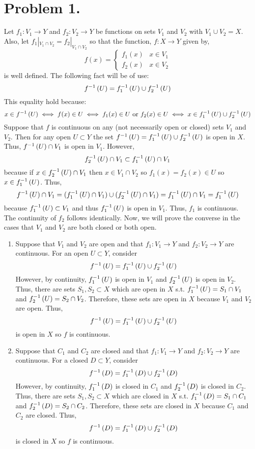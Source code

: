 \documentclass[12pt]{extarticle}
\begin{document}

\section*{Problem 1.}
Let $f_1 : V_1 \to Y$ and $f_2 : V_2 \to Y$ be functions on sets $V_1$ and $V_2$ with $V_1 \cup V_2 = X$. Also, let $f_1 |_{V_1 \cap V_2} = f_2 |_{V_1 \cap V_2}$ so that the function, $f : X \to Y$ given by, 
\[ f(x) =  
\begin{cases}
f_1(x) & x \in V_1 \\
f_2(x) & x \in V_2
\end{cases}
\]
is well defined. The following fact will be of use: 
\[f^{-1} \left( U \right) = f_1^{-1} \left( U \right) \cup f_2^{-1} \left( U \right)\]
This equality hold because:
\[x \in f^{-1} \left( U \right) \iff f(x) \in U \iff f_1(x) \in U \text{ or } f_2(x) \in U \iff x \in f_1^{-1} \left( U \right) \cup f_2^{-1} \left( U \right)\] 
Suppose that $f$ is continuous on any (not necessarily open or closed) sets $V_1$ and $V_2$. Then for any open $U \subset Y$ the set $f^{-1} \left( U \right) = f_1^{-1} \left( U \right) \cup f_2^{-1} \left( U \right)$ is open in $X$. Thus, $f^{-1} \left( U \right) \cap V_1$ is open in $V_1$. However, \[f_2^{-1} \left( U \right) \cap V_1 \subset f_1^{-1} \left( U \right) \cap V_1\] because if $x \in f_2^{-1} \left( U \right) \cap V_1$ then $x \in V_1 \cap V_2$ so $f_1(x) = f_2(x) \in U$ so $x \in f_1^{-1} \left( U \right)$. Thus, \[f^{-1} \left( U \right) \cap V_1 = (f_1^{-1} \left( U \right) \cap V_1) \cup (f_2^{-1} \left( U \right) \cap V_1) = f_1^{-1} \left( U \right) \cap V_1 = f_1^{-1} \left( U \right)\] because $f_1^{-1} \left( U \right) \subset V_1$ and thus $f_1^{-1} \left( U \right)$ is open in $V_1$. Thus, $f_1$ is continuous. The continuity of $f_2$ follows identically. Now, we will prove the converse in the cases that $V_1$ and $V_2$ are both closed or both open. 

\begin{enumerate}
\item Suppose that $V_1$ and $V_2$ are open and that $f_1 : V_1 \to Y$ and $f_2 : V_2 \to Y$ are continuous. For an open $U \subset Y$, consider \[f^{-1} \left( U \right) = f_1^{-1} \left( U \right) \cup f_2^{-1} \left( U \right)\]
However, by continuity, $f_1^{-1} \left( U \right)$ is open in $V_1$ and $f_2^{-1} \left( U \right)$ is open in $V_2$. Thus, there are sets $S_1, S_2 \subset X$ which are open in $X$ s.t. $f_1^{-1} \left( U \right) = S_1 \cap V_1$ and $f_2^{-1} \left( U \right) = S_2 \cap V_2$. Therefore, these sets are open in $X$ because $V_1$ and $V_2$ are open. Thus, \[f^{-1} \left( U \right) = f_1^{-1} \left( U \right) \cup f_2^{-1} \left( U \right)\] is open in $X$ so $f$ is continuous.

\item Suppose that $C_1$ and $C_2$ are closed and that $f_1 : V_1 \to Y$ and $f_2 : V_2 \to Y$ are continuous. For a closed $D \subset Y$, consider \[f^{-1} \left( D \right) = f_1^{-1} \left( D \right) \cup f_2^{-1} \left( D \right)\]
However, by continuity, $f_1^{-1} \left( D \right)$ is closed in $C_1$ and $f_2^{-1} \left( D \right)$ is closed in $C_2$. Thus, there are sets $S_1, S_2 \subset X$ which are closed in $X$ s.t. $f_1^{-1} \left( D \right) = S_1 \cap C_1$ and $f_2^{-1} \left( D \right) = S_2 \cap C_2$. Therefore, these sets are closed in $X$ because $C_1$ and $C_2$ are closed. Thus, \[f^{-1} \left( D \right) = f_1^{-1} \left( D \right) \cup f_2^{-1} \left( D \right)\] is closed in $X$ so $f$ is continuous.

\end{enumerate}
\end{document}
